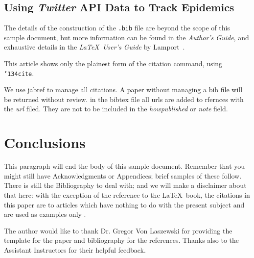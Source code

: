 \documentclass[sigconf]{acmart}
\begin{document}
\subsection{Using {\itshape Twitter} API Data to Track Epidemics}

The details of the construction of the \texttt{.bib} file are beyond
the scope of this sample document, but more information can be found
in the \textit{Author's Guide}, and exhaustive details in the
\textit{\LaTeX\ User's Guide} by Lamport~.

This article shows only the plainest form of the citation command,
using \texttt{{\char'134}cite}.

We use jabref to manage all citations. A paper without managing a bib
file will be returned without review. in the bibtex file all urls are
added to rfernces with the {\it url} filed. They are not to be
included in the {\it howpublished} or {\it note} field. 



\section{Conclusions}

This paragraph will end the body of this sample document.  Remember
that you might still have Acknowledgments or Appendices; brief samples
of these follow.  There is still the Bibliography to deal with; and we
will make a disclaimer about that here: with the exception of the
reference to the \LaTeX\ book, the citations in this paper are to
articles which have nothing to do with the present subject and are
used as examples only \cite{Paul2014}.


\begin{acks}

  The author would like to thank Dr. Gregor Von Laszewski for providing the 
  \LaTex template for the paper and \JabRef bibliography for the references. 
  Thanks also to the Assistant Instructors for their helpful feedback.

\end{acks}


 
\end{document}
